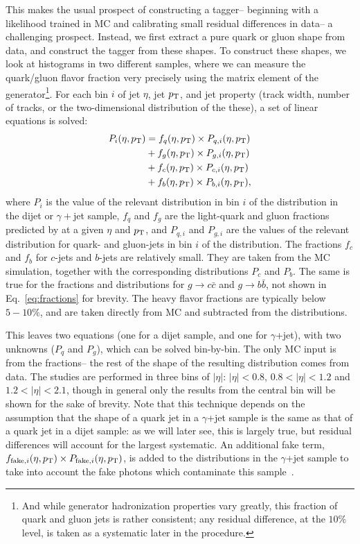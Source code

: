 This makes the usual prospect of constructing a tagger-- beginning with a likelihood trained in MC and calibrating small residual differences in data-- a challenging prospect. Instead, we first extract a pure quark or gluon shape from data, and construct the tagger from these shapes. To construct these shapes, we look at histograms in two different samples, where we can measure the quark/gluon flavor fraction very precisely using the matrix element of the generator\footnote{And while generator hadronization properties vary greatly, this fraction of quark and gluon jets is rather consistent; any residual difference, at the $10\%$ level, is taken as a systematic later in the procedure.}. For each bin $i$ of jet $\eta$, jet $p_{\text{T}}$, and jet property (track width, number of tracks, or the two-dimensional distribution of the these), a set of linear equations is solved:
%
\begin{align}
P_i(\eta,p_{\text{T}}) &= f_{q}(\eta,p_{\text{T}}) \times P_{q,i}(\eta,p_{\text{T}}) \nonumber \\
	& + f_{g}(\eta,p_{\text{T}}) \times P_{g,i}(\eta,p_{\text{T}}) \nonumber \\
& + f_{c}(\eta,p_{\text{T}}) \times P_{c,i}(\eta,p_{\text{T}}) \nonumber \\
& + f_{b}(\eta,p_{\text{T}}) \times P_{b,i}(\eta,p_{\text{T}}) , 
\label{eq:fractions}
\end{align}
%
where $P_i$ is the value of the relevant distribution in bin $i$ of the distribution in the dijet
or $\gamma+$jet sample, $f_{q}$ and $f_{g}$ are the light-quark and gluon fractions 
predicted by \Pythia at a given $\eta$ and $p_{\text{T}}$, 
and $P_{q,i}$ and $P_{g,i}$ are the values of the relevant distribution 
for quark- and gluon-jets in bin $i$ of the distribution. The fractions 
$f_{c}$ and $f_{b}$ for $c$-jets and $b$-jets are relatively small. They are taken from the
MC simulation, together with the corresponding distributions $P_{c}$ and $P_{b}$.
The same is true for the fractions and distributions for $g\rightarrow c\bar{c}$ and $g\rightarrow b\bar{b}$,
not shown in Eq.~\ref{eq:fractions} for brevity. The heavy flavor fractions are typically below $5-10\%$, and are taken directly from MC and subtracted from the distributions.

This leaves two equations (one for a dijet sample, and one for $\gamma$+jet), with two unknowns ($P_{q}$ and $P_{g}$), which can be solved bin-by-bin. The only MC input is from the fractions-- the rest of the shape of the resulting distribution comes from data. The studies are performed in three bins of $|\eta|$: $|\eta|<0.8$, $0.8<|\eta|<1.2$ and $1.2<|\eta|<2.1$, though in general only the results from the central bin will be shown for the sake of brevity. Note that this technique depends on the assumption that the shape of a quark jet in a $\gamma$+jet sample is the same as that of a quark jet in a dijet sample: as we will later see, this is largely true, but residual differences will account for the largest systematic. An additional fake term,  $f_{{\rm fake}, i}(\eta,p_{\text{T}})\times P_{{\rm fake}, i}(\eta,p_{\text{T}})$, is added to the distributions in the $\gamma$+jet sample to take into account the fake photons which contaminate this sample~\cite{JES2011}.

